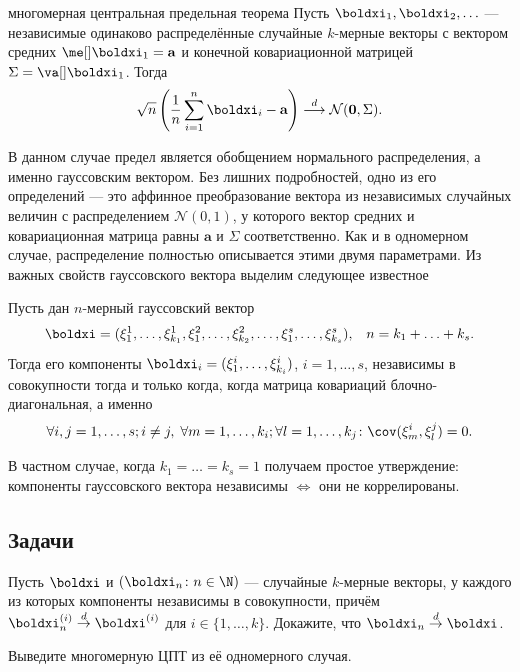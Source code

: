 \begin{theorem}{многомерная центральная предельная теорема}{}
    Пусть $\boldxi_1, \boldxi_2, \ldots$ --- независимые одинаково распределённые случайные $k$-мерные векторы с вектором средних $\me[] \boldxi_1 = \mathbf a$ и конечной ковариационной матрицей $\Sigma = \va[] \boldxi_1$. Тогда
    \[
    \sqrt{n}\left(\frac{1}{n}\sum_{i=1}^n \boldxi_i - \mathbf a\right) \stackrel{d}{\longrightarrow} \mathcal{N}(\mathbf 0, \Sigma).
    \]
\end{theorem}

В данном случае предел является обобщением нормального распределения, а именно гауссовским вектором. Без лишних подробностей, одно из его определений --- это аффинное преобразование вектора из независимых случайных величин с распределением $\mathcal{N}(0, 1)$, у которого вектор средних и ковариационная матрица равны $\mathbf a$ и $\Sigma$ соответственно. Как и в одномерном случае, распределение полностью описывается этими двумя параметрами. Из важных свойств гауссовского вектора выделим следующее известное

\begin{proposition}\label{cov_and_ind_are_eq}
    Пусть дан $n$-мерный гауссовский вектор
$$
\boldxi = (\xi_{1}^1, \ldots, \xi_{k_1}^1, \xi_{1}^2, \ldots, \xi_{k_2}^2, \ldots, \xi_{1}^s, \ldots, \xi_{k_s}^s), \;\;\; n = k_1 + \ldots + k_s.
$$
Тогда его компоненты $\boldxi_i = (\xi_{1}^i, \ldots, \xi_{k_i}^i)$, $i=1, \ldots, s$, независимы в совокупности тогда и только когда, когда матрица ковариаций блочно-диагональная, а именно
$$
\forall i, j = 1, \ldots, s; i \ne j,\;\forall m = 1, \ldots, k_i;  \forall l = 1, \ldots, k_j\colon \cov(\xi^i_{m}, \xi^j_{l}) = 0.
$$
\end{proposition}

В частном случае, когда $k_1 = \ldots = k_s = 1$ получаем простое утверждение: компоненты гауссовского вектора независимы $\Longleftrightarrow$ они не коррелированы.

\subsection*{Задачи}

\begin{problem}\label{weak_conv_while_ind}
	Пусть $\boldxi$ и $(\boldxi_n\colon n \in \N)$ --- случайные $k$-мерные векторы, у каждого из которых компоненты независимы в совокупности, причём $\boldxi_n^{(i)} \stackrel{d}{\to} \boldxi^{(i)}$ для $i \in \{1, \ldots, k\}$. Докажите, что $\boldxi_n \stackrel{d}{\to} \boldxi$.
\end{problem}

\begin{problem}
	Выведите многомерную ЦПТ из её одномерного случая.
\end{problem}

